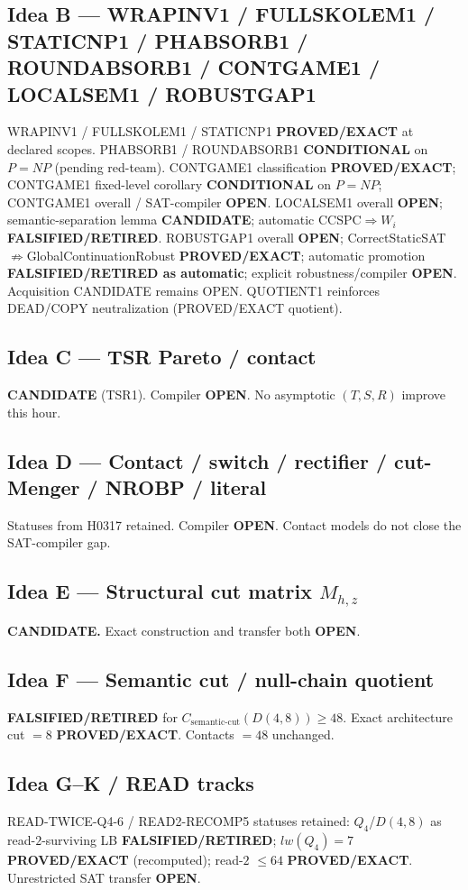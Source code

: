 \documentclass[11pt]{article}
\begin{document}
\subsection*{Idea B --- WRAPINV1 / FULLSKOLEM1 / STATICNP1 / PHABSORB1 / ROUNDABSORB1 / CONTGAME1 / LOCALSEM1 / ROBUSTGAP1}
WRAPINV1 / FULLSKOLEM1 / STATICNP1 \textbf{PROVED/EXACT} at declared scopes.
PHABSORB1 / ROUNDABSORB1 \textbf{CONDITIONAL} on $P=NP$ (pending red-team).
CONTGAME1 classification \textbf{PROVED/EXACT}; CONTGAME1 fixed-level corollary
\textbf{CONDITIONAL} on $P=NP$; CONTGAME1 overall / SAT-compiler \textbf{OPEN}.
LOCALSEM1 overall \textbf{OPEN}; semantic-separation lemma \textbf{CANDIDATE};
automatic CCSPC$\Rightarrow W_i$ \textbf{FALSIFIED/RETIRED}.
ROBUSTGAP1 overall \textbf{OPEN}; CorrectStaticSAT$\not\Rightarrow$GlobalContinuationRobust
\textbf{PROVED/EXACT}; automatic promotion \textbf{FALSIFIED/RETIRED as automatic};
explicit robustness/compiler \textbf{OPEN}.
Acquisition CANDIDATE remains OPEN.
QUOTIENT1 reinforces DEAD/COPY neutralization (PROVED/EXACT quotient).

\subsection*{Idea C --- TSR Pareto / contact}
\textbf{CANDIDATE} (TSR1). Compiler \textbf{OPEN}. No asymptotic $(T,S,R)$ improve this hour.

\subsection*{Idea D --- Contact / switch / rectifier / cut-Menger / NROBP / literal}
Statuses from H0317 retained. Compiler \textbf{OPEN}. Contact models do not close the SAT-compiler gap.

\subsection*{Idea E --- Structural cut matrix $M_{h,z}$}
\textbf{CANDIDATE.} Exact construction and transfer both \textbf{OPEN}.

\subsection*{Idea F --- Semantic cut / null-chain quotient}
\textbf{FALSIFIED/RETIRED} for $C_{\mathrm{semantic\textrm{-}cut}}(D(4,8))\ge48$.
Exact architecture cut $=8$ \textbf{PROVED/EXACT}. Contacts $=48$ unchanged.

\subsection*{Idea G--K / READ tracks}
READ-TWICE-Q4-6 / READ2-RECOMP5 statuses retained: $Q_4$/$D(4,8)$ as read-$2$-surviving LB
\textbf{FALSIFIED/RETIRED}; $lw(Q_4)=7$ \textbf{PROVED/EXACT} (recomputed); read-$2$ $\le64$
\textbf{PROVED/EXACT}. Unrestricted SAT transfer \textbf{OPEN}.
\end{document}
